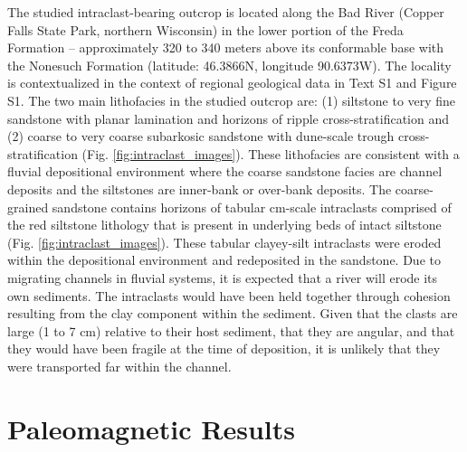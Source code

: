 \documentclass[draft]{agujournal2019}
\begin{document}
The studied intraclast-bearing outcrop is located along the Bad River (Copper Falls State Park, northern Wisconsin) in the lower portion of the Freda Formation -- approximately 320 to 340 meters above its conformable base with the Nonesuch Formation (latitude:  46.3866\textdegree N, longitude 90.6373\textdegree W). The locality is contextualized in the context of regional geological data \cite{Survey2011a,Nicholson2004a,Jirsa2011a,Ullman2015a,Stewart2017a} in Text S1 and Figure S1. The two main lithofacies in the studied outcrop are: (1) siltstone to very fine sandstone with planar lamination and horizons of ripple cross-stratification and (2) coarse to very coarse subarkosic sandstone with dune-scale trough cross-stratification (Fig. \ref{fig:intraclast_images}). These lithofacies are consistent with a fluvial depositional environment where the coarse sandstone facies are channel deposits and the siltstones are inner-bank or over-bank deposits. The coarse-grained sandstone contains horizons of tabular cm-scale intraclasts comprised of the red siltstone lithology that is present in underlying beds of intact siltstone (Fig. \ref{fig:intraclast_images}). These tabular clayey-silt intraclasts were eroded within the depositional environment and redeposited in the sandstone. Due to migrating channels in fluvial systems, it is expected that a river will erode its own sediments. The intraclasts would have been held together through cohesion resulting from the clay component within the sediment. Given that the clasts are large (1 to 7 cm) relative to their host sediment, that they are angular, and that they would have been fragile at the time of deposition, it is unlikely that they were transported far within the channel.

\section*{Paleomagnetic Results}
\end{document}
